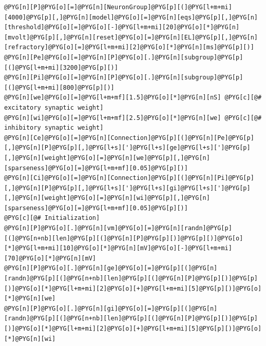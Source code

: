 \documentclass[letterpaper,10pt,english]{manual}
\begin{document}
\begin{Verbatim}[commandchars=@\[\]]
@PYG[n][P]@PYG[o][=]@PYG[n][NeuronGroup]@PYG[p][(]@PYG[l+m+mi][4000]@PYG[p][,]@PYG[n][model]@PYG[o][=]@PYG[n][eqs]@PYG[p][,]@PYG[n][threshold]@PYG[o][=]@PYG[o][-]@PYG[l+m+mi][20]@PYG[o][*]@PYG[n][mvolt]@PYG[p][,]@PYG[n][reset]@PYG[o][=]@PYG[n][EL]@PYG[p][,]@PYG[n][refractory]@PYG[o][=]@PYG[l+m+mi][2]@PYG[o][*]@PYG[n][ms]@PYG[p][)]
@PYG[n][Pe]@PYG[o][=]@PYG[n][P]@PYG[o][.]@PYG[n][subgroup]@PYG[p][(]@PYG[l+m+mi][3200]@PYG[p][)]
@PYG[n][Pi]@PYG[o][=]@PYG[n][P]@PYG[o][.]@PYG[n][subgroup]@PYG[p][(]@PYG[l+m+mi][800]@PYG[p][)]
@PYG[n][we]@PYG[o][=]@PYG[l+m+mf][1.5]@PYG[o][*]@PYG[n][nS] @PYG[c][@# excitatory synaptic weight]
@PYG[n][wi]@PYG[o][=]@PYG[l+m+mf][2.5]@PYG[o][*]@PYG[n][we] @PYG[c][@# inhibitory synaptic weight]
@PYG[n][Ce]@PYG[o][=]@PYG[n][Connection]@PYG[p][(]@PYG[n][Pe]@PYG[p][,]@PYG[n][P]@PYG[p][,]@PYG[l+s][']@PYG[l+s][ge]@PYG[l+s][']@PYG[p][,]@PYG[n][weight]@PYG[o][=]@PYG[n][we]@PYG[p][,]@PYG[n][sparseness]@PYG[o][=]@PYG[l+m+mf][0.05]@PYG[p][)]
@PYG[n][Ci]@PYG[o][=]@PYG[n][Connection]@PYG[p][(]@PYG[n][Pi]@PYG[p][,]@PYG[n][P]@PYG[p][,]@PYG[l+s][']@PYG[l+s][gi]@PYG[l+s][']@PYG[p][,]@PYG[n][weight]@PYG[o][=]@PYG[n][wi]@PYG[p][,]@PYG[n][sparseness]@PYG[o][=]@PYG[l+m+mf][0.05]@PYG[p][)]
@PYG[c][@# Initialization]
@PYG[n][P]@PYG[o][.]@PYG[n][vm]@PYG[o][=]@PYG[n][randn]@PYG[p][(]@PYG[n+nb][len]@PYG[p][(]@PYG[n][P]@PYG[p][)]@PYG[p][)]@PYG[o][*]@PYG[l+m+mi][10]@PYG[o][*]@PYG[n][mV]@PYG[o][-]@PYG[l+m+mi][70]@PYG[o][*]@PYG[n][mV]
@PYG[n][P]@PYG[o][.]@PYG[n][ge]@PYG[o][=]@PYG[p][(]@PYG[n][randn]@PYG[p][(]@PYG[n+nb][len]@PYG[p][(]@PYG[n][P]@PYG[p][)]@PYG[p][)]@PYG[o][*]@PYG[l+m+mi][2]@PYG[o][+]@PYG[l+m+mi][5]@PYG[p][)]@PYG[o][*]@PYG[n][we]
@PYG[n][P]@PYG[o][.]@PYG[n][gi]@PYG[o][=]@PYG[p][(]@PYG[n][randn]@PYG[p][(]@PYG[n+nb][len]@PYG[p][(]@PYG[n][P]@PYG[p][)]@PYG[p][)]@PYG[o][*]@PYG[l+m+mi][2]@PYG[o][+]@PYG[l+m+mi][5]@PYG[p][)]@PYG[o][*]@PYG[n][wi]


\end{Verbatim}
\end{document}
